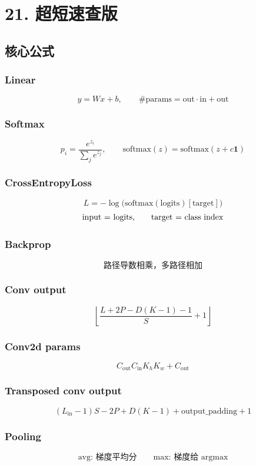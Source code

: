 \section{21. 超短速查版}

\subsection{核心公式}

\subsubsection{Linear}
\[
y=Wx+b,\qquad
\#\mathrm{params}=\mathrm{out}\cdot\mathrm{in}+\mathrm{out}
\]

\subsubsection{Softmax}
\[
p_i=\frac{e^{z_i}}{\sum_j e^{z_j}},\qquad
\mathrm{softmax}(z)=\mathrm{softmax}(z+c\mathbf 1)
\]

\subsubsection{CrossEntropyLoss}
\[
L=-\log\bigl(\mathrm{softmax}(\mathrm{logits})[\mathrm{target}]\bigr)
\]
\[
\text{input = logits,\qquad target = class index}
\]

\subsubsection{Backprop}
\[
\text{路径导数相乘，多路径相加}
\]

\subsubsection{Conv output}
\[
\left\lfloor
\frac{L+2P-D(K-1)-1}{S}+1
\right\rfloor
\]

\subsubsection{Conv2d params}
\[
C_{\mathrm{out}}C_{\mathrm{in}}K_hK_w+C_{\mathrm{out}}
\]

\subsubsection{Transposed conv output}
\[
(L_{\mathrm{in}}-1)S-2P+D(K-1)+\mathrm{output\_padding}+1
\]

\subsubsection{Pooling}
\[
\text{avg: 梯度平均分}\qquad
\text{max: 梯度给 argmax}
\]

